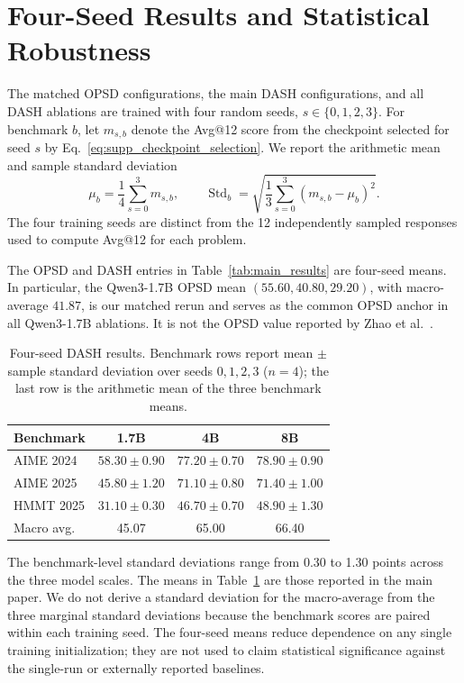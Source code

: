 \documentclass[letterpaper]{article} %
\begin{document}
\section{Four-Seed Results and Statistical Robustness}
\label{sec:four_seed_results}

The matched OPSD configurations, the main DASH configurations, and all
DASH ablations are trained with four random seeds,
\(s\in\{0,1,2,3\}\). For benchmark \(b\), let \(m_{s,b}\) denote the
Avg@12 score from the checkpoint selected for seed \(s\) by
Eq.~\eqref{eq:supp_checkpoint_selection}. We report the arithmetic mean
and sample standard deviation
\begin{equation}
    \mu_b=\frac{1}{4}\sum_{s=0}^{3}m_{s,b},
    \qquad
    \operatorname{Std}_b
    =
    \sqrt{
        \frac{1}{3}
        \sum_{s=0}^{3}(m_{s,b}-\mu_b)^2
    }.
    \label{eq:supp_seed_statistics}
\end{equation}
The four training seeds are distinct from the 12 independently sampled
responses used to compute Avg@12 for each problem.

The OPSD and DASH entries in Table~\ref{tab:main_results} are four-seed
means. In particular, the Qwen3-1.7B OPSD mean
$(55.60,40.80,29.20)$, with macro-average $41.87$, is our matched rerun
and serves as the common OPSD anchor in all Qwen3-1.7B ablations. It is
not the OPSD value reported by Zhao et al.~\cite{zhao2026selfdistilled}.

\begin{table}[!htbp]
\centering
\footnotesize
\setlength{\tabcolsep}{3.7pt}
\begin{tabular}{@{}lccc@{}}
\toprule
\textbf{Benchmark} & \textbf{1.7B} & \textbf{4B} & \textbf{8B} \\
\midrule
AIME 2024 & $58.30\pm0.90$ & $77.20\pm0.70$ & $78.90\pm0.90$ \\
AIME 2025 & $45.80\pm1.20$ & $71.10\pm0.80$ & $71.40\pm1.00$ \\
HMMT 2025 & $31.10\pm0.30$ & $46.70\pm0.70$ & $48.90\pm1.30$ \\
\midrule
Macro avg. & 45.07 & 65.00 & 66.40 \\
\bottomrule
\end{tabular}
\caption{Four-seed DASH results. Benchmark rows report mean $\pm$
sample standard deviation over seeds $0,1,2,3$ ($n=4$); the last row is
the arithmetic mean of the three benchmark means.}
\label{tab:supp_four_seed_results}
\end{table}

The benchmark-level standard deviations range from 0.30 to 1.30 points
across the three model scales. The means in
Table~\ref{tab:supp_four_seed_results} are those reported in the main
paper. We do not derive a standard deviation for the macro-average from
the three marginal standard deviations because the benchmark scores are
paired within each training seed. The four-seed means reduce dependence
on any single training initialization; they are not used to claim
statistical significance against the single-run or externally reported
baselines.
\end{document}
